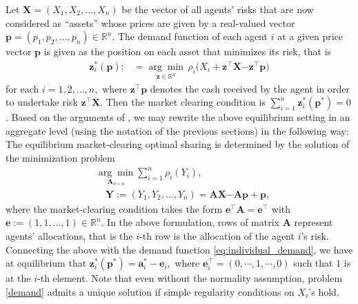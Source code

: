 \documentclass[fleqn,mnsc,nonblindrev]{informs4}
\newcommand{\tb}[1]{\textbf{#1}}
\begin{document}
Let $\tb{X}=(X_1,X_2,...,X_n)$ be the vector of all agents' risks that are now considered as ``assets'' whose prices are given by a real-valued vector $\tb{p}=(p_1,p_2,...,p_n)\in\mathbb{R}^n$. The demand function of each agent $i$ at a given price vector $\tb{p}$ is given as the position on each asset that minimizes its risk, that is
\begin{equation}\label{eq:individual_demand}
\begin{aligned}
\mathbf{z}_{i}^*(\tb{p}):&=\underset{\mathbf{z}\in\mathbb{R}^n }{\arg \min }\,
\rho_i(X_i+\tb{z}^\top\tb{X}  {-\tb{z}^\top\tb{p})}
\end{aligned} 
\end{equation}
for each $i=1,2,\dots,n,$  {where $\tb{z}^\top\tb{p}$ denotes the cash received by the agent in order to undertake risk $\tb{z}^\top\tb{X}$. Then the market clearing condition is $\sum_{i=1}^n\tb{z}^*_i(\tb{p}^*)=0$.} Based on the arguments of \cite[Proposition 2.1]{anthropelos2010agent}, we may rewrite the above equilibrium setting in an aggregate level (using the notation of the previous sections) in the following way: The equilibrium market-clearing optimal sharing is determined by the solution of the minimization problem  
\begin{equation}\label{demand}
\begin{aligned}
&\underset{\mathbf{A}_{n\times n}}{\arg \min } \sum_{i=1}^n
\rho_i(Y_i), \\
&\quad \mathbf{Y}:=(Y_1,Y_2,\dots,Y_n)=\mathbf{A}\mathbf{X}  {-\mathbf{A}\mathbf{p}+\mathbf{p},}
\end{aligned}
\end{equation}
where the market-clearing condition takes the form $\mathbf{e}^\top \mathbf{A}=\mathbf{e}^\top$ with $\tb{e}:=(1,1,\dots,1)\in\mathbb{R}^n$. In the above formulation, rows of matrix $\mathbf{A}$ represent agents' allocations, that is the $i$-th row is the allocation of the agent $i$'s risk. Connecting the above with the demand function \eqref{eq:individual_demand}, we have at equilibrium that $\tb{z}_i^*(\tb{p}^*)=\mathbf{a}_{i}^*-\tb{e}_{i},$ where $\tb{e}_{i}^\top=(0,\cdots,1,\cdots,0)$ such that $1$ is at the $i$-th element. Note that even without the normality assumption, problem \eqref{demand} admits a unique solution if simple regularity conditions on $X_i$'s hold. 
\end{document}
